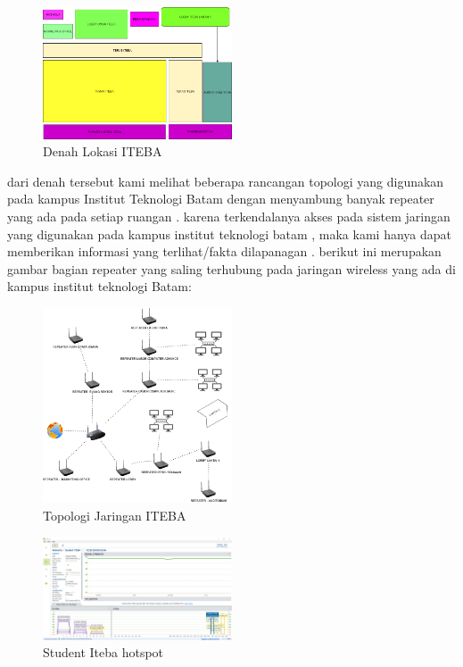 \documentclass[conference]{IEEEtran}
\begin{document}
\begin{figure}[h]
    \centering
    \includegraphics[width=0.5\textwidth]{denah-iteba.png}
    \caption{Denah Lokasi ITEBA}
\end{figure}

dari denah tersebut kami melihat beberapa rancangan topologi yang digunakan pada kampus Institut Teknologi Batam dengan menyambung banyak repeater yang 
ada pada setiap ruangan . karena terkendalanya akses pada sistem jaringan yang digunakan pada kampus institut teknologi batam , maka kami hanya dapat memberikan 
informasi yang terlihat/fakta dilapanagan . berikut ini merupakan gambar bagian repeater yang saling terhubung pada jaringan wireless yang ada di kampus institut teknologi Batam:

\begin{figure}[h]
    \centering
    \includegraphics[width=0.5\textwidth]{router-iteba.png}
    \caption{Topologi Jaringan ITEBA}
\end{figure}
\vspace{5cm}
\begin{figure}[h]
    \centering
    \includegraphics[width=0.5\textwidth]{2.png}
    \caption{Student Iteba hotspot}
\end{figure}
\end{document}
